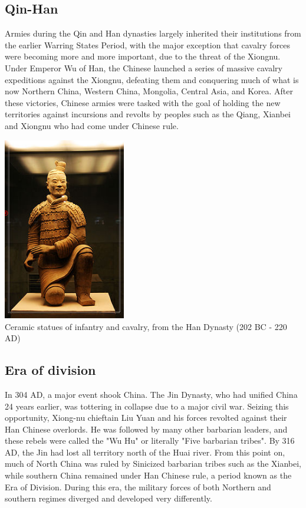 \documentclass[compress]{beamer}
\begin{document}
\begin{frame}
\subsection{Qin-Han}
Armies during the Qin and Han dynasties largely inherited their institutions from the earlier Warring States Period, with the major exception that cavalry forces were becoming more and more important, due to the threat of the Xiongnu. Under Emperor Wu of Han, the Chinese launched a series of massive cavalry expeditions against the Xiongnu, defeating them and conquering much of what is now Northern China, Western China, Mongolia, Central Asia, and Korea. After these victories, Chinese armies were tasked with the goal of holding the new territories against incursions and revolts by peoples such as the Qiang, Xianbei and Xiongnu who had come under Chinese rule.
\end{frame}

\begin{frame}
\begin{center}
\includegraphics[width = 0.40\textwidth]{military-en/d.jpg} \\
Ceramic statues of infantry and cavalry, from the Han Dynasty (202 BC - 220 AD)
\end{center}
\end{frame}

\begin{frame}
\subsection{Era of division}
In 304 AD, a major event shook China. The Jin Dynasty, who had unified China 24 years earlier, was tottering in collapse due to a major civil war. Seizing this opportunity, Xiong-nu chieftain Liu Yuan and his forces revolted against their Han Chinese overlords. He was followed by many other barbarian leaders, and these rebels were called the "Wu Hu" or literally "Five barbarian tribes". By 316 AD, the Jin had lost all territory north of the Huai river. From this point on, much of North China was ruled by Sinicized barbarian tribes such as the Xianbei, while southern China remained under Han Chinese rule, a period known as the Era of Division. During this era, the military forces of both Northern and southern regimes diverged and developed very differently.
\end{frame}
\end{document}
